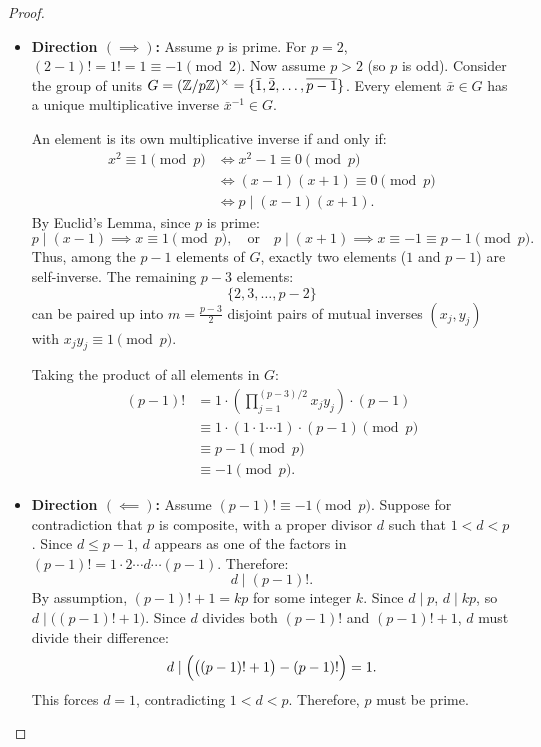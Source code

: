 \begin{proof}
\begin{itemize}[leftmargin=1.5em, itemsep=6pt]
    \item \textbf{Direction $(\implies)$:} Assume $p$ is prime.
    For $p = 2$, $(2-1)! = 1! = 1 \equiv -1 \pmod 2$.
    Now assume $p > 2$ (so $p$ is odd).
    Consider the group of units $G = (\mathbb{Z}/p\mathbb{Z})^\times = \{ \bar{1}, \bar{2}, \dots, \overline{p-1} \}$.
    Every element $\bar{x} \in G$ has a unique multiplicative inverse $\bar{x}^{-1} \in G$.
    
    An element is its own multiplicative inverse if and only if:
    \begin{align*}
    x^2 \equiv 1 \pmod p 
    &\iff x^2 - 1 \equiv 0 \pmod p \\
    &\iff (x - 1)(x + 1) \equiv 0 \pmod p \\
    &\iff p \mid (x - 1)(x + 1).
    \end{align*}
    By Euclid's Lemma, since $p$ is prime:
    \begin{equation*}
    p \mid (x - 1) \implies x \equiv 1 \pmod p, \quad \text{or} \quad p \mid (x + 1) \implies x \equiv -1 \equiv p - 1 \pmod p.
    \end{equation*}
    Thus, among the $p - 1$ elements of $G$, exactly two elements ($1$ and $p - 1$) are self-inverse.
    The remaining $p - 3$ elements:
    \begin{equation*}
    \{ 2, 3, \dots, p - 2 \}
    \end{equation*}
    can be paired up into $m = \frac{p-3}{2}$ disjoint pairs of mutual inverses $(x_j, y_j)$ with $x_j y_j \equiv 1 \pmod p$.
    
    Taking the product of all elements in $G$:
    \begin{align*}
    (p - 1)! &= 1 \cdot \left( \prod_{j=1}^{(p-3)/2} x_j y_j \right) \cdot (p - 1) \\
    &\equiv 1 \cdot (1 \cdot 1 \cdots 1) \cdot (p - 1) \pmod p \\
    &\equiv p - 1 \pmod p \\
    &\equiv -1 \pmod p.
    \end{align*}

    \item \textbf{Direction $(\impliedby)$:} Assume $(p-1)! \equiv -1 \pmod p$.
    Suppose for contradiction that $p$ is composite, with a proper divisor $d$ such that $1 < d < p$.
    Since $d \le p - 1$, $d$ appears as one of the factors in $(p - 1)! = 1 \cdot 2 \cdots d \cdots (p - 1)$.
    Therefore:
    \begin{equation*}
    d \mid (p - 1)!.
    \end{equation*}
    By assumption, $(p - 1)! + 1 = k p$ for some integer $k$.
    Since $d \mid p$, $d \mid kp$, so $d \mid \bigl((p - 1)! + 1\bigr)$.
    Since $d$ divides both $(p-1)!$ and $(p-1)! + 1$, $d$ must divide their difference:
    \begin{equation*}
    d \mid \Bigl(\bigl((p - 1)! + 1\bigr) - (p - 1)!\Bigr) = 1.
    \end{equation*}
    This forces $d = 1$, contradicting $1 < d < p$.
    Therefore, $p$ must be prime.
\end{itemize}
\end{proof}

